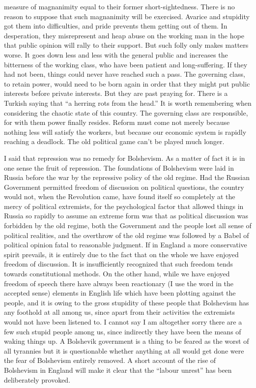 \documentclass{book}
\begin{document}
measure of magnanimity equal to their former short-sightedness. There is no reason to suppose that such magnanimity will be exercised. Avarice and stupidity got them into difficulties, and pride prevents them getting out of them. In desperation, they misrepresent and heap abuse on the working man in the hope that public opinion will rally to their support. But such folly only makes matters worse. It goes down less and less with the general public and increases the bitterness of the working class, who have been patient and long-suffering. If they had not been, things could never have reached such a pass. The governing class, to retain power, would need to be born again in order that they might put public interests before private interests. But they are past praying for. There is a Turkish saying that “a herring rots from the head.” It is worth remembering when considering the chaotic state of this country. The governing class are responsible, for with them power finally resides. Reform must come not merely because nothing less will satisfy the workers, but because our economic system is rapidly reaching a deadlock. The old political game can’t be played much longer.

I said that repression was no remedy for Bolshevism. As a matter of fact it is in one sense the fruit of repression. The foundations of Bolshevism were laid in Russia before the war by the repressive policy of the old regime. Had the Russian Government permitted freedom of discussion on political questions, the country would not, when the Revolution came, have found itself so completely at the mercy of political extremists, for the psychological factor that allowed things in Russia so rapidly to assume an extreme form was that as political discussion was forbidden by the old regime, both the Government and the people lost all sense of political realities, and the overthrow of the old regime was followed by a Babel of political opinion fatal to reasonable judgment. If in England a more conservative spirit prevails, it is entirely due to the fact that on the whole we have enjoyed freedom of discussion. It is insufficiently recognized that such freedom tends towards constitutional methods. On the other hand, while we have enjoyed freedom of speech there have always been reactionary (I use the word in the accepted sense) elements in English life which have been plotting against the people, and it is owing to the gross stupidity of these people that Bolshevism has any foothold at all among us, since apart from their activities the extremists would not have been listened to. I cannot say I am altogether sorry there are a few such stupid people among us, since indirectly they have been the means of waking things up. A Bolshevik government is a thing to be feared as the worst of all tyrannies but it is questionable whether anything at all would get done were the fear of Bolshevism entirely removed. A short account of the rise of Bolshevism in England will make it clear that the “labour unrest” has been deliberately provoked.
\end{document}
